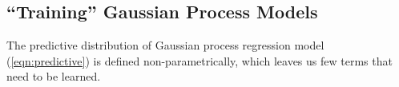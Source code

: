 \subsection{``Training'' Gaussian Process Models}

The predictive distribution of Gaussian process regression model (\autoref{eqn:predictive}) is defined non-parametrically, which leaves us few terms that need to be learned.






